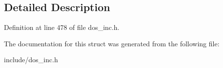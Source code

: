 \subsection{Detailed Description}


Definition at line 478 of file dos\-\_\-inc.\-h.



The documentation for this struct was generated from the following file\-:\begin{DoxyCompactItemize}
\item 
include/dos\-\_\-inc.\-h\end{DoxyCompactItemize}
